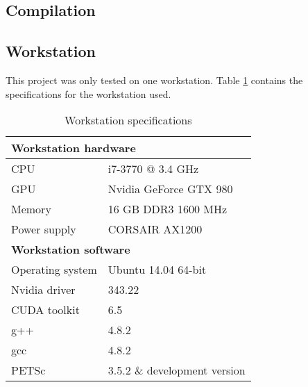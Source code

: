 \subsection{Compilation}

\subsection{Workstation}

This project was only tested on one workstation. Table \ref{table:workstation} contains 
the specifications for the workstation used.

\begin{table}[h]
	\begin{center}
	\bgroup
	\def\arraystretch{1.2}
	\begin{tabular}{|l|l|}
		\hline
		\multicolumn{2}{|l|}{\textbf{Workstation hardware}} \\ \hline
		CPU & i7-3770 @ 3.4 GHz \\ \hline
		GPU & Nvidia GeForce GTX 980 \\ \hline
		Memory & 16 GB DDR3 1600 MHz \\ \hline
		Power supply & CORSAIR AX1200 \\ \hline
		\multicolumn{2}{|l|}{\textbf{Workstation software}} \\ \hline
		Operating system & Ubuntu 14.04 64-bit \\ \hline
		Nvidia driver & 343.22 \\ \hline
		CUDA toolkit & 6.5 \\ \hline
		g++ & 4.8.2 \\ \hline
		gcc & 4.8.2 \\ \hline
		PETSc & 3.5.2 \& development version \\ \hline
	\end{tabular}
	\egroup
	\end{center}
	\caption{Workstation specifications}
	\label{table:workstation}
\end{table}
